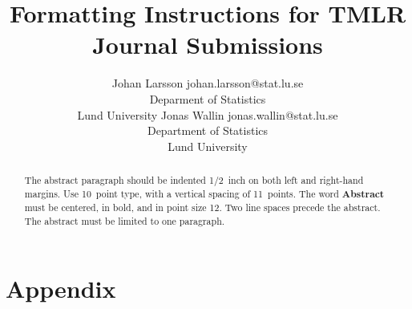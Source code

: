 \documentclass[10pt]{article} %
\title{Formatting Instructions for TMLR \\Journal Submissions}
\author{%
  \name Johan Larsson \email johan.larsson@stat.lu.se\\
  \addr Deparment of Statistics\\Lund University
  \AND
  \name Jonas Wallin \email jonas.wallin@stat.lu.se\\
  \addr Department of Statistics\\Lund University
}
\begin{document}
\maketitle

\begin{abstract}
  The abstract paragraph should be indented 1/2~inch on both left and
  right-hand margins. Use 10~point type, with a vertical spacing of 11~points.
  The word \textbf{\large Abstract} must be centered, in bold, and in point size 12. Two
  line spaces precede the abstract. The abstract must be limited to one
  paragraph.
\end{abstract}







%

%




\appendix

\section{Appendix}


\end{document}
